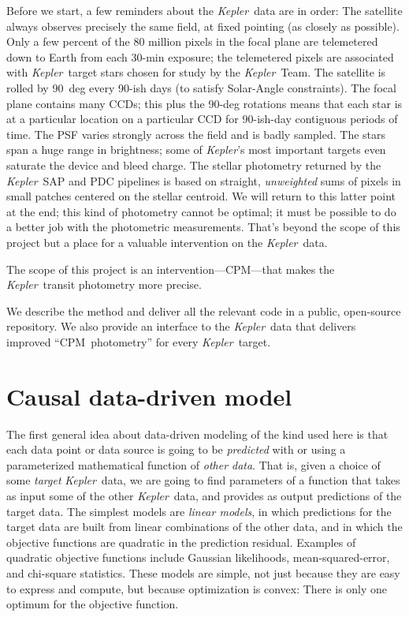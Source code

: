 \documentclass[12pt, preprint]{aastex}
\newcommand{\project}[1]{\textsl{#1}}
\newcommand{\Kepler}{\project{Kepler}}
\newcommand{\name}{CPM}
\begin{document}
Before we start, a few reminders about the \Kepler\ data are in order:
The satellite always observes precisely the same field, at fixed pointing (as closely as possible).
Only a few percent of the 80 million pixels in the focal plane are telemetered down
  to Earth from each 30-min exposure;
  the telemetered pixels are associated with \Kepler\ target stars chosen for study by the \Kepler\ Team.
The satellite is rolled by 90~deg every 90-ish days (to satisfy Solar-Angle constraints).
The focal plane contains many CCDs;
  this plus the 90-deg rotations means that each star is at a particular location
  on a particular CCD for 90-ish-day contiguous periods of time.
The PSF varies strongly across the field and is badly sampled.
The stars span a huge range in brightness;
  some of \Kepler's most important targets even saturate the device and bleed charge.
The stellar photometry returned by the \Kepler\ SAP and PDC pipelines is based on
  straight, \emph{unweighted} sums of pixels in small patches centered on the stellar centroid.
We will return to this latter point at the end;
  this kind of photometry cannot be optimal;
  it must be possible to do a better job with the photometric measurements.
That's beyond the scope of this project but a place for a valuable intervention on the \Kepler\ data.

The scope of this project is an intervention---\name---that makes the \Kepler\ transit photometry more precise.

We describe the method and deliver all the relevant code in a public, open-source repository.
We also provide an interface to the \Kepler\ data that delivers improved ``\name\ photometry''
  for every \Kepler\ target.

\section{Causal data-driven model}

The first general idea about data-driven modeling of the kind used here
  is that each data point or data source is going to be 
  \emph{predicted} with or using a parameterized mathematical function of \emph{other data}.
That is, given a choice of some \emph{target} \Kepler\ data,
  we are going to find parameters of a function that takes as input some of the other \Kepler\ data,
  and provides as output predictions of the target data.
The simplest models are \emph{linear models},
  in which predictions for the target data are built from linear combinations of the other data,
  and in which the objective functions are quadratic in the prediction residual.
Examples of quadratic objective functions include Gaussian likelihoods, mean-squared-error, and chi-square statistics.
These models are simple,
  not just because they are easy to express and compute,
  but because optimization is convex:
There is only one optimum for the objective function.
\end{document}
